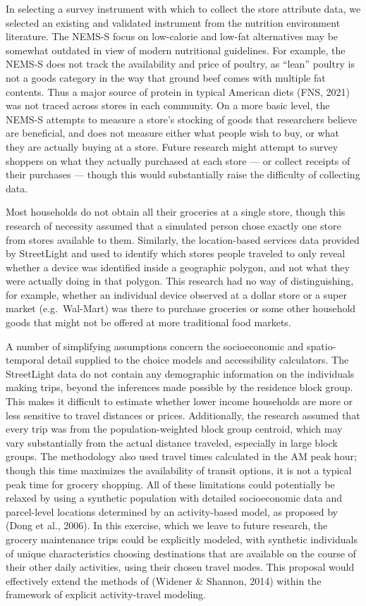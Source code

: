\documentclass[
  letterpaper,
  number,
  review,
  3p]{elsarticle}
\begin{document}
In selecting a survey instrument with which to collect the store
attribute data, we selected an existing and validated instrument from
the nutrition environment literature. The NEMS-S focus on low-calorie
and low-fat alternatives may be somewhat outdated in view of modern
nutritional guidelines. For example, the NEMS-S does not track the
availability and price of poultry, as ``lean'' poultry is not a goods
category in the way that ground beef comes with multiple fat contents.
Thus a major source of protein in typical American diets (FNS, 2021) was
not traced across stores in each community. On a more basic level, the
NEMS-S attempts to measure a store's stocking of goods that researchers
believe are beneficial, and does not measure either what people wish to
buy, or what they are actually buying at a store. Future research might
attempt to survey shoppers on what they actually purchased at each store
--- or collect receipts of their purchases --- though this would
substantially raise the difficulty of collecting data.

Most households do not obtain all their groceries at a single store,
though this research of necessity assumed that a simulated person chose
exactly one store from stores available to them. Similarly, the
location-based services data provided by StreetLight and used to
identify which stores people traveled to only reveal whether a device
was identified inside a geographic polygon, and not what they were
actually doing in that polygon. This research had no way of
distinguishing, for example, whether an individual device observed at a
dollar store or a super market (e.g.~Wal-Mart) was there to purchase
groceries or some other household goods that might not be offered at
more traditional food markets.

A number of simplifying assumptions concern the socioeconomic and
spatio-temporal detail supplied to the choice models and accessibility
calculators. The StreetLight data do not contain any demographic
information on the individuals making trips, beyond the inferences made
possible by the residence block group. This makes it difficult to
estimate whether lower income households are more or less sensitive to
travel distances or prices. Additionally, the research assumed that
every trip was from the population-weighted block group centroid, which
may vary substantially from the actual distance traveled, especially in
large block groups. The methodology also used travel times calculated in
the AM peak hour; though this time maximizes the availability of transit
options, it is not a typical peak time for grocery shopping. All of
these limitations could potentially be relaxed by using a synthetic
population with detailed socioeconomic data and parcel-level locations
determined by an activity-based model, as proposed by (Dong et al.,
2006). In this exercise, which we leave to future research, the grocery
maintenance trips could be explicitly modeled, with synthetic
individuals of unique characteristics choosing destinations that are
available on the course of their other daily activities, using their
chosen travel modes. This proposal would effectively extend the methods
of (Widener \& Shannon, 2014) within the framework of explicit
activity-travel modeling.
\end{document}
